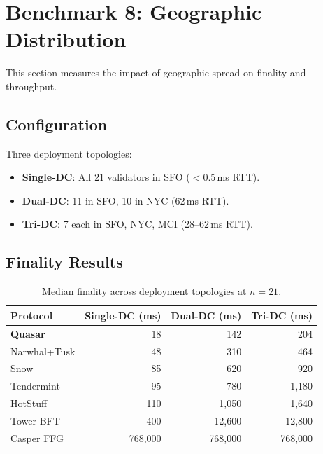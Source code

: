 \section{Benchmark 8: Geographic Distribution}

\label{sec:geo}

This section measures the impact of geographic spread on finality and throughput.

\subsection{Configuration}

Three deployment topologies:

\begin{itemize}
\item \textbf{Single-DC}: All 21 validators in SFO ($<$0.5\,ms RTT).
\item \textbf{Dual-DC}: 11 in SFO, 10 in NYC (62\,ms RTT).
\item \textbf{Tri-DC}: 7 each in SFO, NYC, MCI (28--62\,ms RTT).
\end{itemize}

\subsection{Finality Results}

\begin{table}[h]
\centering
\begin{tabular}{@{}lrrr@{}}
\toprule
\textbf{Protocol} & \textbf{Single-DC (ms)} & \textbf{Dual-DC (ms)} & \textbf{Tri-DC (ms)} \\
\midrule
\textbf{Quasar}   & 18    & 142   & 204 \\
Narwhal+Tusk      & 48    & 310   & 464 \\
Snow              & 85    & 620   & 920 \\
Tendermint        & 95    & 780   & 1{,}180 \\
HotStuff          & 110   & 1{,}050 & 1{,}640 \\
Tower BFT         & 400   & 12{,}600 & 12{,}800 \\
Casper FFG        & 768{,}000 & 768{,}000 & 768{,}000 \\
\bottomrule
\end{tabular}
\caption{Median finality across deployment topologies at $n=21$.}
\label{tab:geo-finality}
\end{table}


